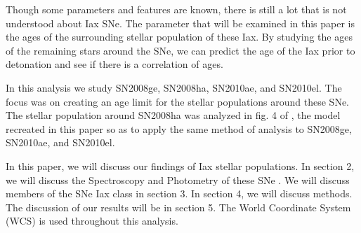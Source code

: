 \documentclass[preprint]{aastex}
\begin{document}

Though some parameters and features are known, there is still a lot 
that is not understood about Iax SNe.
The parameter that will be examined in this paper is the ages 
of the surrounding stellar population of these Iax.
By studying the ages of the remaining stars around the SNe,
we can predict the age of the Iax prior to detonation and 
see if there is a correlation of ages.  

In this analysis we study SN2008ge, SN2008ha, 
SN2010ae, and SN2010el. %
The focus was on creating an age limit for the stellar populations around these SNe.
The stellar population around SN2008ha was analyzed in fig. 4 of \citet{fol1409}, 
the model recreated in this paper so as to apply the same method 
of analysis to SN2008ge, SN2010ae, and SN2010el. %

In this paper, we will discuss our findings of Iax stellar populations.
In section 2, we will discuss the Spectroscopy and Photometry of these SNe .
We will discuss members of the SNe Iax class in section 3. 
In section 4, we will discuss methods.
The discussion of our results will be in section 5. 
The World Coordinate System (WCS) is used throughout this analysis. 

\end{document}
